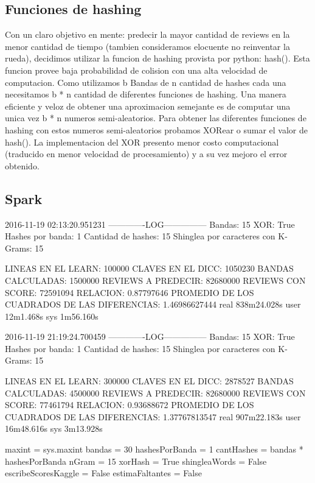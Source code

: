 \documentclass[a4paper,10pt]{article}
\begin{document}
	
	\subsection{Funciones de hashing}

	Con un claro objetivo en mente: predecir la mayor cantidad de reviews en la menor cantidad de tiempo (tambien consideramos elocuente no reinventar la rueda), decidimos utilizar la funcion de hashing provista por python: hash(). Esta funcion provee baja probabilidad de colision con una alta velocidad de computacion. Como utilizamos b Bandas de n cantidad de hashes cada una necesitamos b * n cantidad de diferentes funciones de hashing. Una manera eficiente y veloz de obtener una aproximacion semejante es de computar una unica vez b * n numeros semi-aleatorios. Para obtener las diferentes funciones de hashing con estos numeros semi-aleatorios probamos XORear o sumar el valor de hash(). La implementacion del XOR presento menor costo computacional (traducido en menor velocidad de procesamiento) y a su vez mejoro el error obtenido.
	
		
	\subsection{Spark}
	
	2016-11-19 02:13:20.951231
	-------------LOG---------------
	Bandas: 15
	XOR: True
	Hashes por banda: 1
	Cantidad de hashes: 15
	Shinglea por caracteres con K-Grams: 15
	
	LINEAS EN EL LEARN: 100000
	CLAVES EN EL DICC: 1050230
	BANDAS CALCULADAS: 1500000
	REVIEWS A PREDECIR: 82680000
	REVIEWS CON SCORE: 72591094
	RELACION: 0.87797646
	PROMEDIO DE LOS CUADRADOS DE LAS DIFERENCIAS: 1.46986627444
	real	838m24.028s
	user	12m1.468s
	sys	1m56.160s
	
	2016-11-19 21:19:24.700459
	-------------LOG---------------
	Bandas: 15
	XOR: True
	Hashes por banda: 1
	Cantidad de hashes: 15
	Shinglea por caracteres con K-Grams: 15
	
	LINEAS EN EL LEARN: 300000
	CLAVES EN EL DICC: 2878527
	BANDAS CALCULADAS: 4500000
	REVIEWS A PREDECIR: 82680000
	REVIEWS CON SCORE: 77461794
	RELACION: 0.93688672
	PROMEDIO DE LOS CUADRADOS DE LAS DIFERENCIAS: 1.37767813547
	real	907m22.183s
	user	16m48.616s
	sys	3m13.928s
	
	maxint = sys.maxint
	bandas = 30
	hashesPorBanda = 1
	cantHashes = bandas * hashesPorBanda
	nGram = 15
	xorHash = True
	shingleaWords = False
	escribeScoresKaggle = False
	estimaFaltantes = False
	
\end{document}
